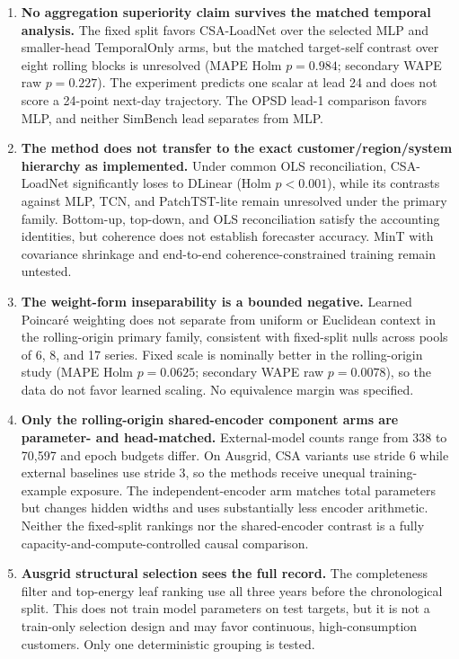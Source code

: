 \documentclass[electronics,article,submit,moreauthors]{Definitions/mdpi}
\providecommand{\tightlist}{\setlength{\itemsep}{0pt}\setlength{\parskip}{0pt}}
\begin{document}
\begin{enumerate}
\def\labelenumi{\arabic{enumi}.}
\tightlist
\item
  \textbf{No aggregation superiority claim survives the matched temporal analysis.} The fixed split favors CSA-LoadNet over the selected MLP and smaller-head TemporalOnly arms, but the matched target-self contrast over eight rolling blocks is unresolved (MAPE Holm \(p=0.984\); secondary WAPE raw \(p=0.227\)). The experiment predicts one scalar at lead 24 and does not score a 24-point next-day trajectory. The OPSD lead-1 comparison favors MLP, and neither SimBench lead separates from MLP.
\item
  \textbf{The method does not transfer to the exact customer/region/system hierarchy as implemented.} Under common OLS reconciliation, CSA-LoadNet significantly loses to DLinear (Holm \(p<0.001\)), while its contrasts against MLP, TCN, and PatchTST-lite remain unresolved under the primary family. Bottom-up, top-down, and OLS reconciliation satisfy the accounting identities, but coherence does not establish forecaster accuracy. MinT with covariance shrinkage and end-to-end coherence-constrained training remain untested.
\item
  \textbf{The weight-form inseparability is a bounded negative.} Learned Poincar\'{e} weighting does not separate from uniform or Euclidean context in the rolling-origin primary family, consistent with fixed-split nulls across pools of 6, 8, and 17 series. Fixed scale is nominally better in the rolling-origin study (MAPE Holm \(p=0.0625\); secondary WAPE raw \(p=0.0078\)), so the data do not favor learned scaling. No equivalence margin was specified.
\item
  \textbf{Only the rolling-origin shared-encoder component arms are parameter- and head-matched.} External-model counts range from 338 to 70,597 and epoch budgets differ. On Ausgrid, CSA variants use stride 6 while external baselines use stride 3, so the methods receive unequal training-example exposure. The independent-encoder arm matches total parameters but changes hidden widths and uses substantially less encoder arithmetic. Neither the fixed-split rankings nor the shared-encoder contrast is a fully capacity-and-compute-controlled causal comparison.
\item
  \textbf{Ausgrid structural selection sees the full record.} The completeness filter and top-energy leaf ranking use all three years before the chronological split. This does not train model parameters on test targets, but it is not a train-only selection design and may favor continuous, high-consumption customers. Only one deterministic grouping is tested.

\end{enumerate}
\end{document}
